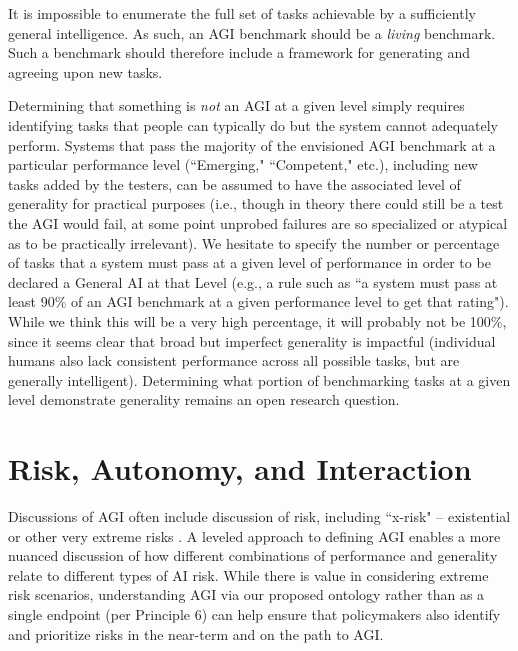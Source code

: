 \documentclass{article}
\theoremstyle{plain}
\theoremstyle{definition}
\theoremstyle{remark}
\begin{document}
It is impossible to enumerate the full set of tasks achievable by a sufficiently general intelligence. As such, an AGI benchmark should be a \textit{living} benchmark. Such a benchmark should therefore include a framework for generating and agreeing upon new tasks. 

Determining that something is \textit{not} an AGI at a given level simply requires identifying tasks that people can typically do but the system cannot adequately perform. Systems that pass the majority of the envisioned AGI benchmark at a particular performance level (``Emerging," ``Competent," etc.), including new tasks added by the testers, can be assumed to have the associated level of generality for practical purposes (i.e., though in theory there could still be a test the AGI would fail, at some point unprobed failures are so specialized or atypical as to be practically irrelevant). 
We hesitate to specify the number or percentage of tasks that a system must pass at a given level of performance in order to be declared a General AI at that Level (e.g., a rule such as ``a system must pass at least 90\% of an AGI benchmark at a given performance level to get that rating"). While we think this will be a very high percentage, it will probably not be 100\%, since it seems clear that broad but imperfect generality is impactful (individual humans also lack consistent performance across all possible tasks, but are generally intelligent). Determining what portion of benchmarking tasks at a given level demonstrate generality remains an open research question.  


\section{Risk, Autonomy, and Interaction}
\label{risk}

Discussions of AGI often include discussion of risk, including ``x-risk" -- existential \citep{xriskPetition} or other very extreme risks \citep{shevlane2023model}. A leveled approach to defining AGI enables a more nuanced discussion of how different combinations of performance and generality relate to different types of AI risk. While there is value in considering extreme risk scenarios, understanding AGI via our proposed ontology rather than as a single endpoint (per Principle 6) can help ensure that policymakers also identify and prioritize risks in the near-term and on the path to AGI. 
\end{document}
